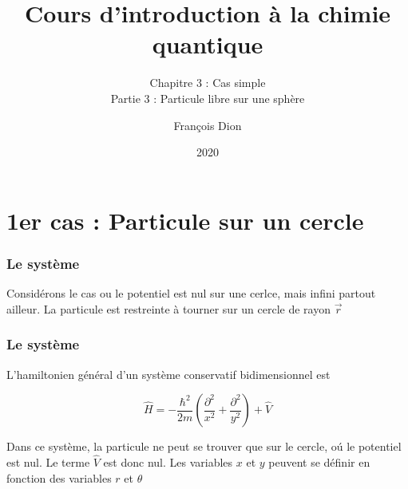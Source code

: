\documentclass[aspectratio=169]{beamer}
\title{Cours d'introduction à la chimie quantique}
\subtitle{Chapitre 3 : Cas simple\\Partie 3 : Particule libre sur une sphère}
\author{François Dion}
\date{2020}
\begin{document}
\frame{\titlepage}




\section{1er cas : Particule sur un cercle}
\begin{frame}
\frametitle{Le système}
Considérons le cas ou le potentiel est nul sur une cerlce, mais infini partout ailleur. La particule est restreinte à tourner sur un cercle de rayon $\vec{r}$ 
\begin{figure}

\end{figure}
\end{frame}

\begin{frame}
\frametitle{Le système}
L'hamiltonien général d'un système conservatif bidimensionnel est

\begin{equation}
\hat{H}=-\frac{\hbar^2}{2m} \left( \frac{\partial^2}{x^2} + \frac{\partial^2}{y^2}\right)+\hat{V}
\end{equation}

Dans ce système, la particule ne peut se trouver que sur le cercle, o\'u le potentiel est nul. Le terme $\hat{V}$ est donc nul.
Les variables $x$ et $y$ peuvent se définir en fonction des variables $r$ et $\theta$

\begin{figure}

\end{figure}
\end{frame}
\end{document}
